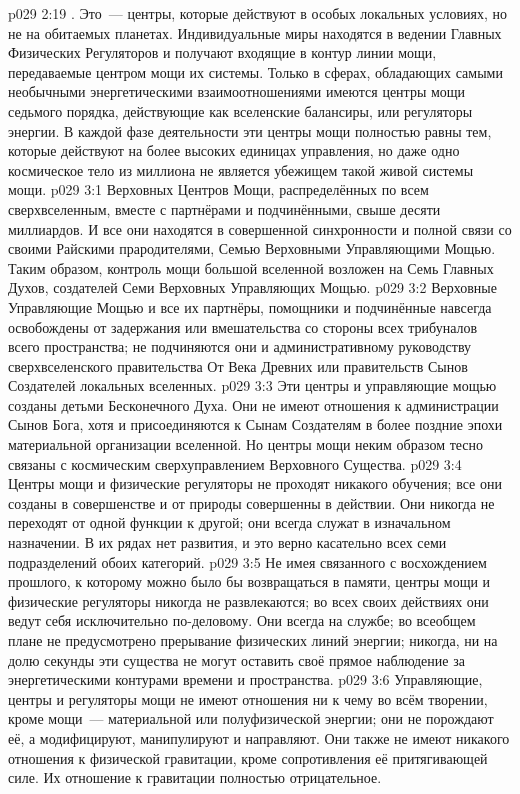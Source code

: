 \vs p029 2:19 . Это~--- центры, которые действуют в особых локальных условиях, но не на обитаемых планетах. Индивидуальные миры находятся в ведении Главных Физических Регуляторов и получают входящие в контур линии мощи, передаваемые центром мощи их системы. Только в сферах, обладающих самыми необычными энергетическими взаимоотношениями имеются центры мощи седьмого порядка, действующие как вселенские балансиры, или регуляторы энергии. В каждой фазе деятельности эти центры мощи полностью равны тем, которые действуют на более высоких единицах управления, но даже одно космическое тело из миллиона не является убежищем такой живой системы мощи.
\vs p029 3:1 Верховных Центров Мощи, распределённых по всем сверхвселенным, вместе с партнёрами и подчинёнными, свыше десяти миллиардов. И все они находятся в совершенной синхронности и полной связи со своими Райскими прародителями, Семью Верховными Управляющими Мощью. Таким образом, контроль мощи большой вселенной возложен на Семь Главных Духов, создателей Семи Верховных Управляющих Мощью.
\vs p029 3:2 Верховные Управляющие Мощью и все их партнёры, помощники и подчинённые навсегда освобождены от задержания или вмешательства со стороны всех трибуналов всего пространства; не подчиняются они и административному руководству сверхвселенского правительства От Века Древних или правительств Сынов Создателей локальных вселенных.
\vs p029 3:3 Эти центры и управляющие мощью созданы детьми Бесконечного Духа. Они не имеют отношения к администрации Сынов Бога, хотя и присоединяются к Сынам Создателям в более поздние эпохи материальной организации вселенной. Но центры мощи неким образом тесно связаны с космическим сверхуправлением Верховного Существа.
\vs p029 3:4 \pc Центры мощи и физические регуляторы не проходят никакого обучения; все они созданы в совершенстве и от природы совершенны в действии. Они никогда не переходят от одной функции к другой; они всегда служат в изначальном назначении. В их рядах нет развития, и это верно касательно всех семи подразделений обоих категорий.
\vs p029 3:5 Не имея связанного с восхождением прошлого, к которому можно было бы возвращаться в памяти, центры мощи и физические регуляторы никогда не развлекаются; во всех своих действиях они ведут себя исключительно по\hyp{}деловому. Они всегда на службе; во всеобщем плане не предусмотрено прерывание физических линий энергии; никогда, ни на долю секунды эти существа не могут оставить своё прямое наблюдение за энергетическими контурами времени и пространства.
\vs p029 3:6 \pc Управляющие, центры и регуляторы мощи не имеют отношения ни к чему во всём творении, кроме мощи~--- материальной или полуфизической энергии; они не порождают её, а модифицируют, манипулируют и направляют. Они также не имеют никакого отношения к физической гравитации, кроме сопротивления её притягивающей силе. Их отношение к гравитации полностью отрицательное.
